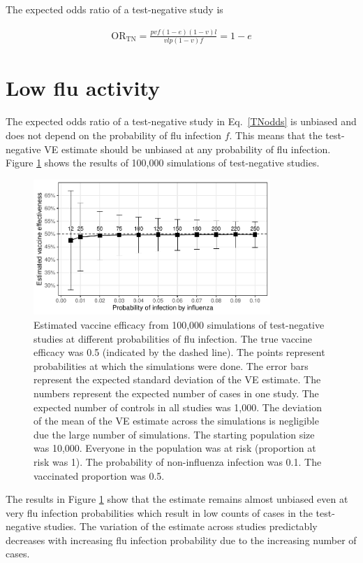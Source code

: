 \documentclass[12pt]{article}
\begin{document}
The expected odds ratio of a test-negative study is 

\begin{align}
\text{OR}_{\text{TN}}=\frac{pvf(1-e)(1-v)l}{vlp(1-v)f} = 1-e
\label{TNodds}
\end{align}


\pagebreak
%
\section{Low flu activity}

The expected odds ratio of a test-negative study in Eq.\ \ref{TNodds} is unbiased and does not depend on the probability of flu infection $f$. This means that the test-negative VE estimate should be unbiased at any probability of flu infection. Figure \ref{pflu} shows the results of 100,000 simulations of test-negative studies.

\begin{figure}[htp]
	\centering
	\includegraphics[width=0.8\textwidth]{../graph/pflu.pdf}
	\caption{
	Estimated vaccine efficacy from 100,000 simulations of test-negative studies at different probabilities of flu infection. The true vaccine efficacy was 0.5 (indicated by the dashed line). The points represent probabilities at which the simulations were done. The error bars represent the expected standard deviation of the VE estimate. The numbers represent the expected number of cases in one study. The expected number of controls in all studies was 1,000. The deviation of the mean of the VE estimate across the simulations is negligible due the large number of simulations. The starting population size was 10,000. Everyone in the population was at risk (proportion at risk was 1). The probability of non-influenza infection was 0.1. The vaccinated proportion was 0.5.
	}
	\label{pflu}
\end{figure}

The results in Figure \ref{pflu} show that the estimate remains almost unbiased even at very flu infection probabilities which result in low counts of cases in the test-negative studies. The variation of the estimate across studies predictably decreases with increasing flu infection probability due to the increasing number of cases. 
\end{document}
